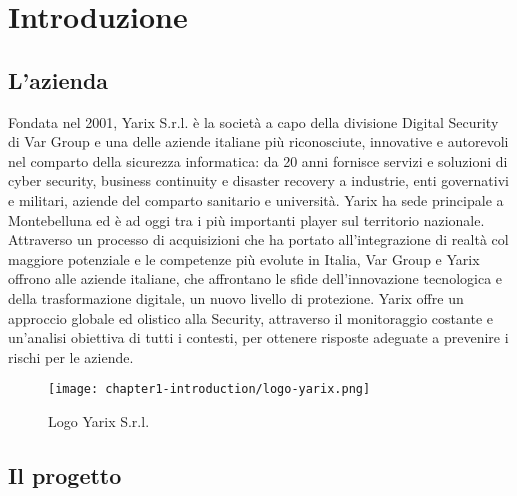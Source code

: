
\chapter{Introduzione}
\label{cap:introduzione}

\newline{}

\section{L'azienda}

Fondata nel 2001, Yarix S.r.l. è la società a capo della divisione Digital Security di Var Group e una delle aziende italiane più riconosciute, innovative e autorevoli nel comparto della sicurezza informatica: da 20 anni fornisce servizi e soluzioni di cyber security, business continuity e disaster recovery a industrie, enti governativi e militari, aziende del comparto sanitario e università. Yarix ha sede principale a Montebelluna ed è ad oggi tra i più importanti player sul territorio nazionale.\newline{}
Attraverso un processo di acquisizioni che ha portato all’integrazione di realtà col maggiore potenziale e le competenze più evolute in Italia, Var Group e Yarix offrono alle aziende italiane, che affrontano le sfide dell’innovazione tecnologica e della trasformazione digitale, un nuovo livello di protezione. Yarix offre un approccio globale ed olistico alla Security, attraverso il monitoraggio costante e un’analisi obiettiva di tutti i contesti, per ottenere risposte adeguate a prevenire i rischi per le aziende.

\begin{figure}[!h] 
    \centering 
    \texttt{[image: chapter1-introduction/logo-yarix.png]} 
    \caption{Logo Yarix S.r.l.}
\end{figure}

\section{Il progetto}

